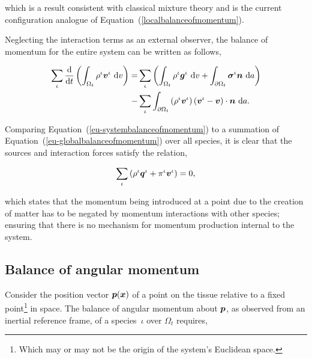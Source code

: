 \noindent which is a result consistent with classical mixture theory
\citep{TruesdellToupin:60} and is the current configuration analogue
of Equation~(\ref{localbalanceofmomentum}).

Neglecting the interaction terms as an external observer, the balance
of momentum for the entire system can be written as follows,

\begin{equation}
\begin{split}
\sum\limits_{\iota}
\frac{\mathrm{d}}{\mathrm{d}t}\left(\int_{\Omega_{t}} \rho^{\iota}
\mbox{\boldmath$ v$}^{\iota} \ \mathrm{d}v \right) = & \sum\limits_{\iota}
\left(\int_{\Omega_{t}} \rho^{\iota} \mbox{\boldmath$ g$}^{\iota} \ \mathrm{d}v +
\int_{\partial \Omega_{t}} \mbox{\boldmath$\sigma$}^{\iota}\mbox{\boldmath$ n$}\ \mathrm{d}a\right)\\ -
&\sum\limits_{\iota}\int_{\partial \Omega_{t}} \left(\rho^{\iota}
\mbox{\boldmath$ v$}^{\iota} \right) \left(\mbox{\boldmath$ v$}^{\iota} - \mbox{\boldmath$ v$}\right) \cdot
\mbox{\boldmath$ n$}\ \mathrm{d}a.
\end{split}
\label{eu-systembalanceofmomentum}
\end{equation}

\noindent Comparing Equation~(\ref{eu-systembalanceofmomentum}) to a
summation of Equation~(\ref{eu-globalbalanceofmomentum}) over all
species, it is clear that the sources and interaction forces satisfy
the relation,

\begin{equation}
\sum\limits_{\iota}\left( \rho^{\iota}\mbox{\boldmath$ q$}^{\iota} + \pi^{\iota}
\mbox{\boldmath$ v$}^{\iota} \right) = 0,
\label{eu-summationrelationmomentum}
\end{equation}

\noindent which states that the momentum being introduced at a point
due to the creation of matter has to be negated by momentum
interactions with other species; ensuring that there is no mechanism
for momentum production internal to the system.

\subsection{Balance of angular momentum}
\label{eu-balance-of-angular-momentum}

Consider the position vector $\mbox{\boldmath$ p$}(\mbox{\boldmath$ x$})$ of a point on the tissue
relative to a fixed point\footnote{Which may or may not be the origin
  of the system's Euclidean space.} in space. The balance of angular
momentum about $\mbox{\boldmath$ p$}$, as observed from an inertial reference frame, of
a species~$\iota$ over $\Omega_{t}$ requires,

